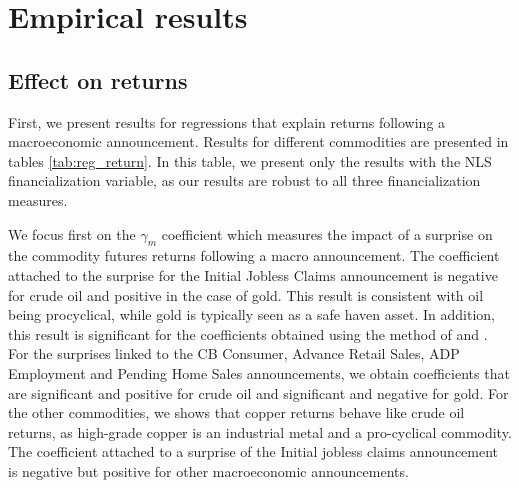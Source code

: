 \documentclass[12pt]{article}
\begin{document}
\section{Empirical results} \label{sec:result}



\subsection{Effect on returns}
First, we present results for regressions that explain returns following a macroeconomic announcement. Results for different commodities are presented in tables \ref{tab:reg_return}. In this table, we present only the results with the NLS financialization variable, as our results are robust to all three financialization measures.

We focus first on the $\gamma_m$ coefficient which measures the impact of a surprise on the commodity futures returns following a macro announcement. The coefficient attached to the surprise for the Initial Jobless Claims announcement is negative for crude oil and positive in the case of gold. This result is consistent with oil being procyclical, while gold is typically seen as a safe haven asset.  In addition, this result is significant for the coefficients obtained using the method of \citet{kurov2019price} and \citet{andersen2007real}. For the surprises linked to the CB Consumer, Advance Retail Sales, ADP Employment and Pending Home Sales announcements, we obtain coefficients that are significant and positive for crude oil  and significant and negative for gold. For the other commodities, we shows that copper returns behave like crude oil returns, as high-grade copper is an industrial metal and a pro-cyclical commodity. The coefficient attached to a surprise of the Initial jobless claims announcement is negative but positive for other macroeconomic announcements. 
\end{document}
